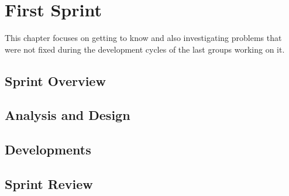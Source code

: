 \chapter{First Sprint}\label{chap:sprint1}
This chapter focuses on getting to know \giraf and also investigating problems that were not fixed during the development cycles of the last groups working on it.

\section{Sprint Overview}\label{sec:sprint1:overview}


\section{Analysis and Design}\label{sec:sprint1:analysis}





\section{Developments}\label{sec:sprint1:developments}








\section{Sprint Review}\label{sec:sprint1:review}

